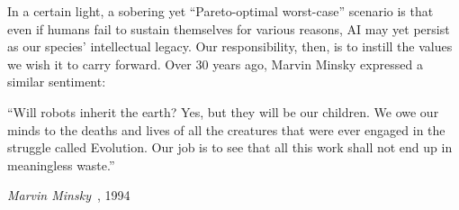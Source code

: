 In a certain light, a sobering yet ``Pareto-optimal worst-case'' scenario is that even if humans fail to sustain themselves for various reasons, AI may yet persist as our species' intellectual legacy. 
Our responsibility, then, is to instill the values we wish it to carry forward. 
Over 30 years ago, Marvin Minsky expressed a similar sentiment:
\par
\epigraph{
    ``Will robots inherit the earth? Yes, but they will be our children. 
    We owe our minds to the deaths and lives of all the creatures that 
    were ever engaged in the struggle called Evolution. Our job is to 
    see that all this work shall not end up in meaningless waste.''}
    {\textit{Marvin Minsky}~\citep{minsky1994will}, 1994}
\par
